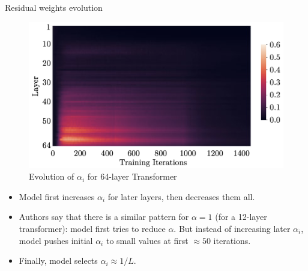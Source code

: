 \documentclass[handout, 10pt]{beamer}
\begin{document}
\begin{frame}{Residual weights evolution}
\begin{figure}
\centering
\includegraphics[width=\textwidth]{images/rezero-weights-evolution}
\caption{Evolution of $\alpha_i$ for 64-layer Transformer}
\end{figure}

\begin{itemize}
    \item\pause Model first increases $\alpha_i$ for later layers, then decreases them all.
    \item\pause Authors say that there is a similar pattern for $\alpha = 1$ (for a 12-layer transformer): model first tries to reduce $\alpha$. But instead of increasing later $\alpha_i$, model pushes initial $\alpha_i$ to small values at first $\approx 50$ iterations.
    \item\pause Finally, model selects $\alpha_i \approx 1/L$.
\end{itemize}
\end{frame}


\end{document}
